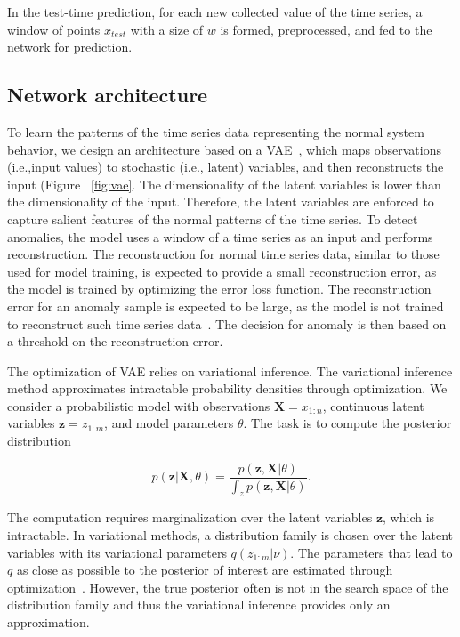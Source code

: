 In the test-time prediction, for each new collected value of the time series, a window of points $x_{test}$ with a size of $w$ is formed, preprocessed, and fed to the network for prediction.

\subsection{Network architecture}
To learn the patterns of the time series data representing the normal system behavior, we design an architecture based on a VAE~\cite{kingma2013auto}, which maps observations (i.e.,input values) to stochastic (i.e., latent) variables, and then reconstructs the input (Figure ~\ref{fig:vae}. The dimensionality of the latent variables is lower than the dimensionality of the input. Therefore, the latent variables are enforced to capture salient features of the normal patterns of the time series.
To detect anomalies, the model uses a window of a time series as an input and performs reconstruction. The reconstruction for normal time series data, similar to those used for model training, is expected to provide a small reconstruction error, as the model is trained by optimizing the error loss function. The reconstruction error for an anomaly sample is expected to be large, as the model is not trained to reconstruct such time series data~\cite{an2015variational}. The decision for anomaly is then based on a threshold on the reconstruction error.

The optimization of VAE relies on variational inference. The variational inference method approximates intractable probability densities through optimization. We consider a probabilistic model with observations $\mathbf{X}=x_{1:n}$, continuous latent variables $\mathbf{z}=z_{1:m}$, and model parameters $\theta$. The task is to compute the posterior distribution

\begin{equation}\label{posterior}
    p(\mathbf{z} \vert \mathbf{X},\theta)=\frac{p(\mathbf{z},\mathbf{X} \vert \theta)}{\int_z p(\mathbf{z},\mathbf{X} \vert \theta)}.
\end{equation}

The computation requires marginalization over the latent variables $\mathbf{z}$, which is intractable. In variational methods, a distribution family is chosen over the latent variables with its variational parameters $q(z_{1:m} \vert \nu)$. The parameters that lead to $q$ as close as possible to the posterior of interest are estimated through optimization~\cite{jordan1999introduction}. However, the true posterior often is not in the search space of the distribution family and thus the variational inference provides only an approximation. 



